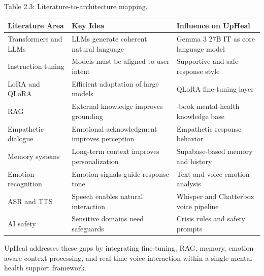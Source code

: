\documentclass[
  letterpaper,
  12pt,
  a4paper,
  openany]{report}
\newcounter{none} %
\begin{document}
Table 2.3: Literature-to-architecture mapping.

{\def\LTcaptype{none} %
\begin{longtable}[]{@{}
  >{\raggedright\arraybackslash}p{}
  >{\raggedright\arraybackslash}p{}
  >{\raggedright\arraybackslash}p{}@{}}
\toprule\noalign{}
\begin{minipage}[b]{\linewidth}\raggedright
Literature Area
\end{minipage} & \begin{minipage}[b]{\linewidth}\raggedright
Key Idea
\end{minipage} & \begin{minipage}[b]{\linewidth}\raggedright
Influence on UpHeal
\end{minipage} \\
\midrule\noalign{}
\endhead
\bottomrule\noalign{}
\endlastfoot
Transformers and LLMs & LLMs generate coherent natural language & Gemma
3 27B IT as core language model \\
Instruction tuning & Models must be aligned to user intent & Supportive
and safe response style \\
LoRA and QLoRA & Efficient adaptation of large models & QLoRA
fine-tuning layer \\
RAG & External knowledge improves grounding & 25-book mental-health
knowledge base \\
Empathetic dialogue & Emotional acknowledgment improves perception &
Empathetic response behavior \\
Memory systems & Long-term context improves personalization &
Supabase-based memory and history \\
Emotion recognition & Emotion signals guide response tone & Text and
voice emotion analysis \\
ASR and TTS & Speech enables natural interaction & Whisper and
Chatterbox voice pipeline \\
AI safety & Sensitive domains need safeguards & Crisis rules and safety
prompts \\
\end{longtable}
}

UpHeal addresses these gaps by integrating fine-tuning, RAG, memory,
emotion-aware context processing, and real-time voice interaction within
a single mental-health support framework.

\end{document}
